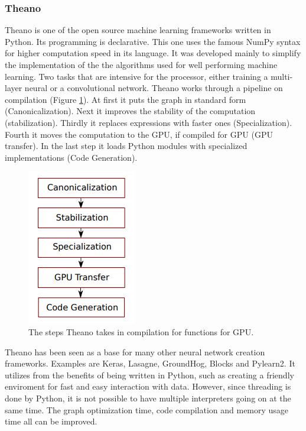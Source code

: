 \documentclass[10pt,a4paper]{report}
\begin{document}
	\subsubsection{Theano}
	
	Theano is one of the open source machine learning frameworks written in 
	Python.\cite{bergstra2010theano} Its programming is declarative. 
	\cite{rampasek2016tensorflow} This one uses the famous NumPy syntax for 
	higher computation speed 
	in its language. It was developed mainly to simplify the implementation of 
	the the algorithms used for well performing machine learning. Two tasks 
	that are intensive for the processor, either training a multi-layer neural 
	or a convolutional network. Theano works through a pipeline on compilation 
	(Figure \ref{fig:TheanoPipe}). At first it puts the graph in standard form 
	(Canonicalization). Next it improves the stability of the computation 
	(stabilization). Thirdly it replaces expressions with faster ones 
	(Specialization). Fourth it moves the computation to the GPU, if compiled 
	for GPU (GPU transfer). In the last step it loads Python modules with 
	specialized implementations (Code Generation). \cite{bergstra2010theano}
	
	\begin{figure}[h!]
		\includegraphics{TheanoPipeline.PNG}
		\caption{The steps Theano takes in compilation for functions for GPU. 
			\cite{bergstra2010theano}}
		\label{fig:TheanoPipe}
	\end{figure}
	
	Theano has been seen as a base for many other neural network creation 
	frameworks. Examples are Keras, Lasagne, GroundHog, Blocks and Pylearn2. It 
	utilizes from the benefits of being written in Python, such as creating a 
	friendly enviroment for fast and easy interaction with data. However, since 
	threading is done by Python, it is not possible to have multiple 
	interpreters going on at the same time. The graph optimization time, code 
	compilation and memory usage time all can be improved. \cite{al2016theano}
	
\end{document}
